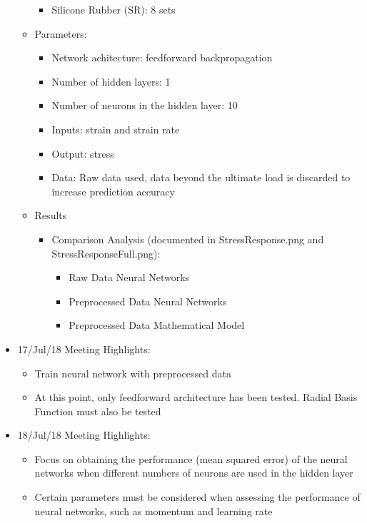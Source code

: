 \begin{itemize}
\begin{itemize}
\begin{itemize}
            \item Silicone Rubber (SR): 8 sets
        \end{itemize}
        \item Parameters:
        \begin{itemize}
            \item Network achitecture: feedforward backpropagation
            \item Number of hidden layers: 1
            \item Number of neurons in the hidden layer: 10
            \item Inputs: strain and strain rate
            \item Output: stress
            \item Data: Raw data used, data beyond the ultimate load is discarded to increase prediction accuracy
        \end{itemize}
        \item Results
        \begin{itemize}
            \item Comparison Analysis (documented in StressResponse.png and StressResponseFull.png):
            \begin{itemize}
                \item Raw Data Neural Networks
                \item Preprocessed Data Neural Networks
                \item Preprocessed Data Mathematical Model
            \end{itemize}
        \end{itemize}
    \end{itemize}
    \item 17/Jul/18 Meeting Highlights:
    \begin{itemize}
        \item Train neural network with preprocessed data
        \item At this point, only feedforward architecture has been tested. Radial Basis Function must also be tested
    \end{itemize}
    \item 18/Jul/18 Meeting Highlights:
    \begin{itemize}
        \item Focus on obtaining the performance (mean squared error) of the neural networks when different numbers of neurons are used in the hidden layer
        \item Certain parameters must be considered when assessing the performance of neural networks, such as momentum and learning rate

\end{itemize}
\end{itemize}
